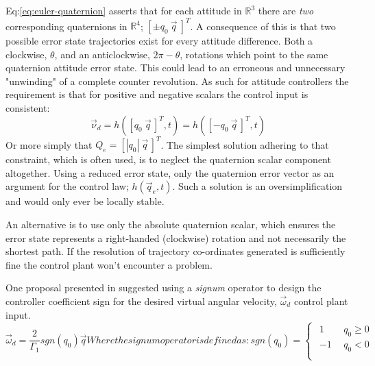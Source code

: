 Eq:\ref{eq:euler-quaternion} asserts that for each attitude in $\mathbb{R}^3$ there are \emph{two} corresponding quaternions in $\mathbb{R}^4$; $[\pm q_0~\vec{q}~]^T$. A consequence of this is that two possible error state trajectories exist for every attitude difference. Both a clockwise, $\theta$, and an anticlockwise, $2\pi-\theta$, rotations which point to the same quaternion attitude error state. This could lead to an erroneous and unnecessary "unwinding" of a complete counter revolution. As such for attitude controllers the requirement is that for positive and negative scalars the control input is consistent:
\begin{equation}
\vec{\nu}_d=h([q_0~\vec{q}\hspace{2pt}]^T,t)=h([-q_0~\vec{q}\hspace{2pt}]^T,t)
\end{equation}
Or more simply that $Q_e=[|q_0|~\vec{q}\hspace{2pt}]^T$. The simplest solution adhering to that constraint, which is often used, is to neglect the quaternion scalar component altogether. Using a reduced error state, only the quaternion error vector as an argument for the control law; $h(\vec{q}_e,t)$. Such a solution is an oversimplification and would only ever be locally stable. 
\par
An alternative is to use only the absolute quaternion scalar, which ensures the error state represents a right-handed (clockwise) rotation and not necessarily the shortest path. If the resolution of trajectory co-ordinates generated is sufficiently fine the control plant won't encounter a problem.
\par
One proposal presented in \cite{nonlinearquadcopter} suggested using a \emph{signum} operator to design the controller coefficient sign for the desired virtual angular velocity, $\vec{\omega}_d$ control plant input. 
\begin{subequations}\label{eq:signum-unwinding}
\begin{equation}
\vec{\omega}_d=\frac{2}{\Gamma_1}sgn(q_0)\vec{q}
\end{equation}
Where the signum operator is defined as:
\begin{equation}
sgn(q_0)=
\begin{cases}\begin{array}{ll}
1 & ~~q_0\geq 0\\
-1 & ~~q_0< 0\\
\end{array}
\end{cases}
\end{equation}
\end{subequations}
